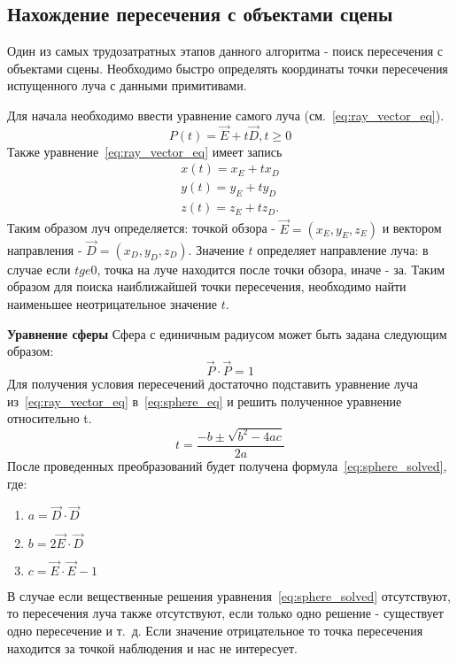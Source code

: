 \subsection{Нахождение пересечения с объектами сцены}
Один из самых трудозатратных этапов данного алгоритма  - поиск пересечения с объектами сцены. Необходимо быстро определять координаты точки пересечения испущенного луча 
с данными примитивами.


Для начала необходимо ввести уравнение самого луча (см.~\ref{eq:ray_vector_eq}).
\begin{equation} 
	P(t) = \vec{E} +t\vec{D},t \ge 0
	\label{eq:ray_vector_eq}
\end{equation}
Также уравнение~\ref{eq:ray_vector_eq} имеет запись
\begin{equation}
	\label{eq:ray_scalar_eq}
	\begin{aligned}
		x(t) = x_E + t x_D \\
		y(t) = y_E + t y_D \\
		z(t) = z_E + t z_D.
	\end{aligned}
\end{equation}
Таким образом луч определяется: точкой обзора - $\vec{E} = (x_E,y_E,z_E)$ и вектором направления - $\vec{D} = (x_D,y_D,z_D)$. Значение $t$  определяет направление луча: в случае если $t ge 0$,
точка на луче находится после точки обзора, иначе - за. Таким образом для поиска наиближайшей точки пересечения, необходимо найти наименьшее неотрицательное значение $t$.\cite{Rodgers,primitives_raytracing_equations} 


\textbf{Уравнение сферы}
Сфера с единичным радиусом может быть задана следующим образом:
\begin{equation}
	\vec{P} \cdot \vec{P}=1
	\label{eq:sphere_eq}
\end{equation}
Для получения условия пересечений достаточно подставить уравнение луча из~\ref{eq:ray_vector_eq} в~\ref{eq:sphere_eq} и решить полученное уравнение относительно t.
\begin{equation}
	t=\frac{-b\pm\sqrt{b^2-4ac}}{2a}
	\label{eq:sphere_solved}
\end{equation}
После проведенных преобразований будет получена формула~\ref{eq:sphere_solved}, где:
\begin{enumerate}
	\item $a = \vec{D} \cdot \vec{D}$ 
	\item $b = 2\vec{E} \cdot \vec{D}$ 
	\item $c = \vec{E} \cdot \vec{E} - 1$
\end{enumerate}
В случае если вещественные решения уравнения~\ref{eq:sphere_solved} отсутствуют, то пересечения луча также отсутствуют, если только одно решение  - существует одно
пересечение и т.~д. Если значение отрицательное то точка пересечения находится за точкой наблюдения и нас не интересует.\cite{primitives_raytracing_equations}

